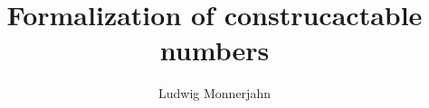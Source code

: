 \documentclass[12pt]{paper}
\title{Formalization of construcactable numbers}
\author{Ludwig Monnerjahn}
\date{\time}
\theoremstyle{definition}
\theoremstyle{remark}
\begin{document}
\maketitle










\nocite{*}
\end{document}
